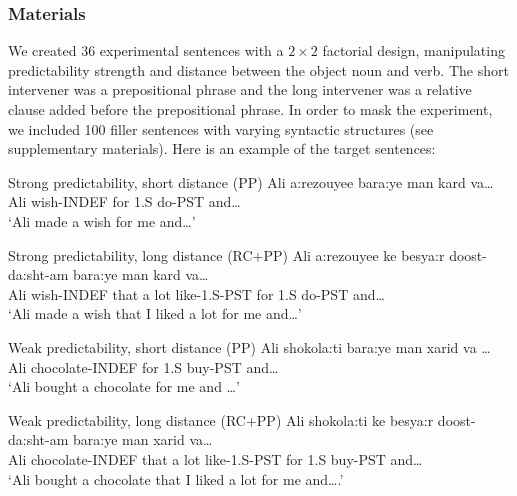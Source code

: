 \documentclass{frontiersSCNS}\usepackage{knitr} %
\begin{document}
\subsubsection{Materials}

We created 36 experimental sentences with a $2 \times 2$ factorial design, manipulating predictability strength and distance between the object noun and verb. The short intervener was a prepositional phrase and the long intervener was a relative clause added before the prepositional phrase. In order to mask the experiment, we included 100 filler sentences with varying syntactic structures (see supplementary materials). Here is an example of the target sentences:

\begin{exe}
\ex
\begin{xlist}
\item Strong predictability, short distance (PP)
\gll Ali a:rezouyee bara:ye man kard va\dots\\
     Ali wish-INDEF for 1.S do-PST and\dots \\
\glt    `Ali made a wish for me and\dots' \\

\item Strong predictability, long distance (RC+PP)
\gll Ali a:rezouyee ke besya:r doost-da:sht-am bara:ye man kard va\dots \\
      Ali wish-INDEF that {a lot} like-1.S-PST for 1.S do-PST and\dots \\
\glt `Ali made a wish that I liked a lot for me and\dots' \\

\item Weak predictability, short distance (PP)
\gll Ali shokola:ti bara:ye man xarid va \dots \\
      Ali chocolate-INDEF for 1.S buy-PST and\dots\\
\glt `Ali bought a chocolate for me and \dots' \\

\item  Weak predictability, long distance (RC+PP)
\gll Ali shokola:ti ke besya:r doost-da:sht-am bara:ye man xarid va\dots \\     
       Ali chocolate-INDEF that {a lot} like-1.S-PST for 1.S buy-PST and\dots\\
\glt  `Ali bought a chocolate that I liked a lot for me and\dots.' 
\end{xlist}
\end{exe}
\end{document}
